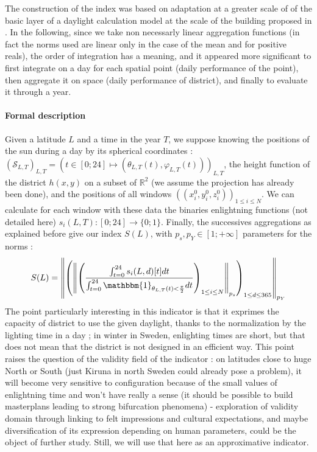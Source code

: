 \documentclass[english]{article}
\begin{document}
\bigskip{}


The construction of the index was based on adaptation at a greater
scale of of the basic layer of a daylight calculation model at the
scale of the building proposed in \cite{miguet2002daylight}. In the
following, since we take non necessarly linear aggregation functions
(in fact the norms used are linear only in the case of the mean and
for positive reals), the order of integration has a meaning, and it
appeared more significant to first integrate on a day for each spatial
point (daily performance of the point), then aggregate it on space
(daily performance of district), and finally to evaluate it through
a year.

\bigskip{}



\paragraph{Formal description}

Given a latitude $L$ and a time in the year $T$, we suppose knowing
the positions of the sun during a day by its spherical coordinates
: $(\mathcal{S}_{L,T})_{L,T}=(t\in[0;24]\mapsto(\theta_{L,T}(t),\varphi_{L,T}(t)))_{L,T}$,
the height function of the district $h(x,y)$ on a subset of $\mathbb{R}^{2}$
(we assume the projection has already been done), and the positions
of all windows $((x_{i}^{0},y_{i}^{0},z_{i}^{0}))_{1\leq i\leq N}$.
We can calculate for each window with these data the binaries enlightning
functions (not detailed here) $s_{i}(L,T):[0;24]\rightarrow\{0;1\}$.
Finally, the successives aggregations as explained before give our
index $S(L)$, with $p_{s},p_{Y}\in[1;+\infty]$ parameters for the
norms : \[S(L)=\left\Vert \left(\left\Vert \left(\frac{\intop_{t=0}^{24}s_{i}(L,d)[t]dt}{\intop_{t=0}^{24}\mathbbm{1}_{\theta_{L,T}(t)<\frac{\pi}{2}}dt}\right)_{1\leq i\leq N}\right\Vert _{p_{s}}\right)_{1\leq d\leq365}\right\Vert _{p_{Y}} \]The
point particularly interesting in this indicator is that it exprimes
the capacity of district to use the given daylight, thanks to the
normalization by the lighting time in a day ; in winter in Sweden,
enlighting times are short, but that does not mean that the district
is not designed in an efficient way. This point raises the question
of the validity field of the indicator : on latitudes close to huge
North or South (just Kiruna in north Sweden could already pose a problem),
it will become very sensitive to configuration because of the small
values of enlightning time and won't have really a sense (it should
be possible to build masterplans leading to strong bifurcation phenomena)
- exploration of validity domain through linking to felt impressions
and cultural expectations, and maybe diversification of its expression
depending on human parameters, could be the object of further study.
Still, we will use that here as an approximative indicator.
\end{document}
